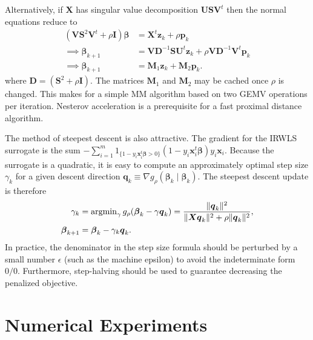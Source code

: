\documentclass[11pt]{article}
\def\argmin{\mathop{\rm argmin}\nolimits}
\newcommand{\bp}{\boldsymbol{p}}
\newcommand{\bq}{\boldsymbol{q}}
\newcommand{\bx}{\boldsymbol{x}}
\newcommand{\bz}{\boldsymbol{z}}
\newcommand{\bD}{\boldsymbol{D}}
\newcommand{\bI}{\boldsymbol{I}}
\newcommand{\bM}{\boldsymbol{M}}
\newcommand{\bS}{\boldsymbol{S}}
\newcommand{\bU}{\boldsymbol{U}}
\newcommand{\bV}{\boldsymbol{V}}
\newcommand{\bX}{\boldsymbol{X}}
\newcommand{\bbeta}{\boldsymbol{\beta}}
\begin{document}
Alternatively, if $\bX$ has singular value decomposition $\bU \bS \bV^{t}$ then the normal equations reduce to
\begin{equation}
\label{alg:MM}
\begin{aligned}
    (\bV \bS^{2} \bV^{t} + \rho \bI) \bbeta &= \bX^{t} \bz_{k} + \rho \bp_{k} \\
    \implies \bbeta_{k+1} &= \bV \bD^{-1} \bS \bU^{t} \bz_{k}
    + \rho \bV \bD^{-1} \bV^{t} \bp_{k} \\
    \implies \bbeta_{k+1} &= \bM_{1} \bz_{k} + \bM_{2} \bp_{k}.
\end{aligned}
\end{equation}
where $\bD = (\bS^{2} + \rho \bI)$.
The matrices $\bM_{1}$ and $\bM_{2}$ may be cached once $\rho$ is changed.
This makes for a simple MM algorithm based on two GEMV operations per iteration.
Nesterov acceleration is a prerequisite for a fast proximal distance algorithm.

The method of steepest descent is also attractive.
The gradient for the IRWLS surrogate is the sum $-\sum_{i=1}^m 1_{\{1-y_i\bx_i^t\bbeta > 0\}}(1-y_i\bx_i^t\bbeta)y_i\bx_i$.
Because the surrogate is a quadratic, it is easy to compute an approximately optimal step size $\gamma_{k}$ for a given descent direction $\bq_{k} \equiv \nabla g_{\rho}(\bbeta_{k} \mid \bbeta_{k})$.
The steepest descent update is therefore
\begin{equation}
\label{alg:SD}
\begin{aligned}
    \gamma_{k} &= \argmin_{\gamma} g_{\rho}(\bbeta_{k} - \gamma \bq_{k})
    = \frac{\|\bq_{k}\|^{2}}{\|\bX \bq_{k}\|^{2} + \rho \|\bq_{k}\|^{2}}, \\
    \bbeta_{k+1} &= \bbeta_{k} - \gamma_{k} \bq_{k}.
\end{aligned}
\end{equation}
In practice, the denominator in the step size formula should be perturbed by a small number $\epsilon$ (such as the machine epsilon) to avoid the indeterminate form $0 / 0$.
Furthermore, step-halving should be used to guarantee decreasing the penalized objective.

\section*{\center Numerical Experiments}
\end{document}
